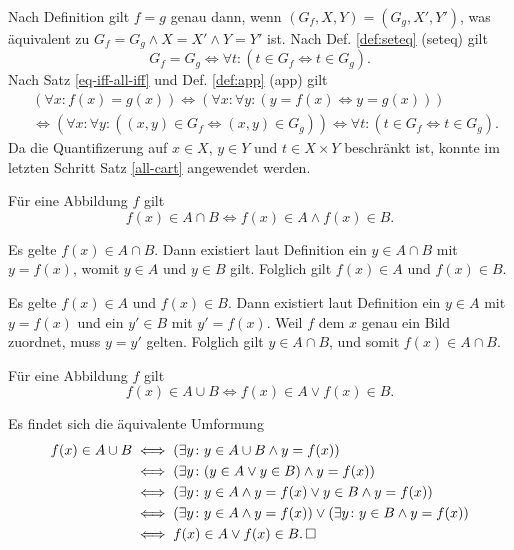 \begin{Beweis}
Nach Definition gilt $f=g$ genau dann, wenn $(G_f,X,Y)=(G_g,X',Y')$,
was äquivalent zu $G_f=G_g\land X=X'\land Y=Y'$ ist. Nach Def.
\ref{def:seteq} (seteq) gilt
\[G_f=G_g\iff \forall t\colon (t\in G_f\Leftrightarrow t\in G_g).\]
Nach Satz \ref{eq-iff-all-iff} und Def. \ref{def:app} (app) gilt
\begin{align*}
&(\forall x\colon f(x)=g(x)) \iff (\forall x\colon\forall y\colon (y=f(x)\Leftrightarrow y=g(x)))\\
&\iff (\forall x\colon\forall y\colon((x,y)\in G_f\Leftrightarrow (x,y)\in G_g))
\iff \forall t\colon (t\in G_f\Leftrightarrow t\in G_g).
\end{align*}
Da die Quantifizerung auf $x\in X$, $y\in Y$ und $t\in X\times Y$
beschränkt ist, konnte im letzten Schritt Satz \ref{all-cart}
angewendet werden.\;\qedsymbol
\end{Beweis}

\begin{Korollar} Für eine Abbildung $f$ gilt
\[f(x)\in A\cap B\iff f(x)\in A\land f(x)\in B.\]
\end{Korollar}
\begin{Beweis}
Es gelte $f(x)\in A\cap B$. Dann existiert laut Definition ein
$y\in A\cap B$ mit $y=f(x)$, womit $y\in A$ und $y\in B$ gilt.
Folglich gilt $f(x)\in A$ und $f(x)\in B$.

Es gelte $f(x)\in A$ und $f(x)\in B$. Dann existiert laut Definition
ein $y\in A$ mit $y=f(x)$ und ein $y'\in B$ mit $y'=f(x)$.
Weil $f$ dem $x$ genau ein Bild zuordnet, muss $y=y'$ gelten.
Folglich gilt $y\in A\cap B$, und somit $f(x)\in A\cap B$.\,\qedsymbol
\end{Beweis}

\begin{Korollar} Für eine Abbildung $f$ gilt
\[f(x)\in A\cup B\iff f(x)\in A\lor f(x)\in B.\]
\end{Korollar}
\begin{Beweis} Es findet sich die äquivalente Umformung
\begin{align*}
f(x)\in A\cup B &\iff (\exists y\colon y\in A\cup B\land y=f(x))\\
&\iff (\exists y\colon (y\in A\lor y\in B)\land y = f(x))\\
&\iff (\exists y\colon y\in A\land y=f(x)\lor y\in B\land y = f(x))\\
&\iff (\exists y\colon y\in A\land y=f(x))\lor (\exists y\colon y\in B\land y = f(x))\\
&\iff f(x)\in A\lor f(x)\in B.\,\square
\end{align*}
\end{Beweis}

